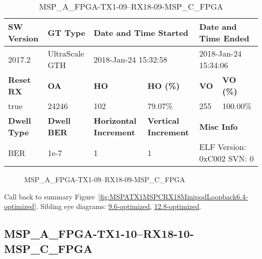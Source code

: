 \begin{table}[h]
\centering
\caption{MSP\_A\_FPGA-TX1-09--RX18-09-MSP\_C\_FPGA}
\label{tab:MSPAFPGATX109RX1809MSPCFPGA6.4-optimized}
\begin{tabular}{@{}|l|l|l|l|l|l|@{}}
\toprule
\textbf{SW Version}                & \textbf{GT Type}   & \multicolumn{2}{l|}{\textbf{Date and Time Started}}            & \multicolumn{2}{l|}{\textbf{Date and Time Ended}}        \\ \midrule
2017.2                       & UltraScale GTH          & \multicolumn{2}{l|}{2018-Jan-24 15:32:58}                   & \multicolumn{2}{l|}{2018-Jan-24 15:34:06}               \\ \midrule
\textbf{Reset RX}                  & \textbf{OA} & \textbf{HO}   & \textbf{HO (\%)} & \textbf{VO} & \textbf{VO (\%)} \\ \midrule
true & 24246        & 102          & 79.07\%        & 255        & 100.00\%       \\ \midrule
\textbf{Dwell Type}                & \textbf{Dwell BER} & \textbf{Horizontal Increment} & \textbf{Vertical Increment}    & \multicolumn{2}{l|}{\textbf{Misc Info}}                  \\ \midrule
BER                            & 1e-7        & 1        & 1           & \multicolumn{2}{l|}{ELF Version: 0xC002 SVN: 0}                         \\ \bottomrule
\end{tabular}
\end{table}

\begin{figure}[h]
\caption{MSP\_A\_FPGA-TX1-09--RX18-09-MSP\_C\_FPGA} \label{fig:MSPAFPGATX109RX1809MSPCFPGA6.4-optimized}
\end{figure}

Call back to summary Figure~\ref{fig:MSPATX1MSPCRX18MinipodLoopback6.4-optimized}.
Sibling eye diagrams: \hyperref[sec:MSPAFPGATX109RX1809MSPCFPGA9.6-optimized]{9.6-optimized}, \hyperref[sec:MSPAFPGATX109RX1809MSPCFPGA12.8-optimized]{12.8-optimized}.

\clearpage
\newpage


\subsection{MSP\_A\_FPGA-TX1-10--RX18-10-MSP\_C\_FPGA}\label{sec:MSPAFPGATX110RX1810MSPCFPGA6.4-optimized}

